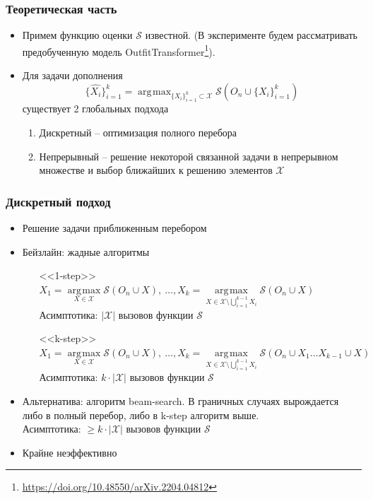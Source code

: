 \documentclass[10pt]{beamer}
\DeclareMathOperator*{\argmax}{\arg\!\max}
\begin{document}
\begin{frame}
	\frametitle{Теоретическая часть}
	\begin{itemize}	
	 	\item Примем функцию оценки $\mathcal{S}$ известной. (В эксперименте будем рассматривать предобученную модель OutfitTransformer\footnote{\url{https://doi.org/10.48550/arXiv.2204.04812}}).
	    \item Для задачи дополнения 
	    $$\{\hat{X_i}\}_{i=1}^k= \argmax_{\{X_i\}_{i=1}^k\subset\mathcal{X}} \mathcal{S}\left(O_n\cup\{X_i\}_{i=1}^k\right)$$
	    существует 2 глобальных подхода 
	    \begin{enumerate}	
	    	\item Дискретный -- оптимизация полного перебора
	    	\item Непрерывный -- решение некоторой связанной задачи в непрерывном множестве и выбор ближайших к решению элементов $\mathcal{X}$
	    \end{enumerate}
	   \end{itemize}
\end{frame}


\begin{frame}
	\frametitle{Дискретный подход}
		\begin{itemize}
			\item Решение задачи приближенным перебором
			\item Бейзлайн: жадные алгоритмы
			\begin{itemize}
				\item[<<1-step>>] $X_1 = \argmax\limits_{X\in\mathcal{X}}{\mathcal{S}(O_n\cup X)},~\dots , X_k = \argmax\limits_{X\in\mathcal{X}\setminus \bigcup\limits_{i=1}^{k-1} X_i} \mathcal{S}(O_n\cup X)$\\
				Асимптотика: $|\mathcal{X}|$ вызовов функции $\mathcal{S}$\\
				
				\item[<<k-step>>] $X_1 = \argmax\limits_{X\in\mathcal{X}}{\mathcal{S}(O_n\cup X)},~\dots , X_k = \argmax\limits_{X\in\mathcal{X}\setminus \bigcup\limits_{i=1}^{k-1} X_i} \mathcal{S}(O_n\cup X_1\dots X_{k-1}\cup X)$\\
				Асимптотика: $k\cdot|\mathcal{X}|$ вызовов функции $\mathcal{S}$
			\end{itemize}
				
			\item Альтернатива: алгоритм beam-search. В граничных случаях вырождается либо в полный перебор, либо в k-step алгоритм выше.\\
			Асимптотика:  $\geqslant k\cdot|\mathcal{X}|$ вызовов функции $\mathcal{S}$
			\item Крайне неэффективно
		\end{itemize}
\end{frame}
\end{document}
